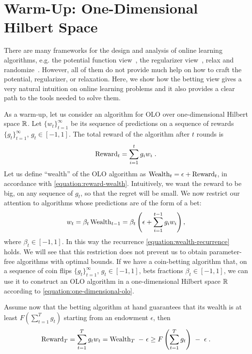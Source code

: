 \section{Warm-Up: One-Dimensional Hilbert Space}
\label{section:one-dimensional-hilbert-space-olo}

There are many frameworks for the design and analysis of online learning
algorithms, e.g. the potential function view~\cite{Cesa-Bianchi-Lugosi-2006},
the regularizer view~\cite{Shalev-Shwartz-2011}, relax and
randomize~\cite{Rakhlin-Shamir-Sridharan-2012}. However, all of them do not
provide much help on how to craft the potential, regularizer, or relaxation.
Here, we show how the betting view gives a very natural intuition on online
learning problems and it also provides a clear path to the tools needed to
solve them.

As a warm-up, let us consider an algorithm for OLO over one-dimensional Hilbert
space $\mathbb{R}$.  Let $\{w_t\}_{t=1}^\infty$ be its sequence of predictions on a
sequence of rewards $\{g_t\}_{t=1}^\infty$, $g_t \in [-1,1]$. The total reward
of the algorithm after $t$ rounds is
\vspace{-.1cm}
\[
\operatorname{Reward}_t = \sum_{i=1}^t g_i w_i \; .
\]
Let us define ``wealth'' of the OLO algorithm as $\operatorname{Wealth}_t = \epsilon +
\operatorname{Reward}_t$, in accordance with \eqref{equation:reward-wealth}.
Intuitively, we want the reward to be big, on any sequence of $g_t$, so that
the regret will be small. We now restrict our attention to algorithms whose
predictions are of the form of a bet:
\vspace{-.1cm}
\begin{equation}
\label{equation:one-dimensional-olo}
w_t = \beta_t \operatorname{Wealth}_{t-1}
= \beta_t \left(\epsilon+ \sum_{i=1}^{t-1} g_i w_i \right),
\end{equation}
where $\beta_t \in [-1,1]$. In this way the recurrence
\eqref{equation:wealth-recurrence} holds. We will see that this restriction
does not prevent us to obtain parameter-free algorithms with optimal bounds.
If we have a coin-betting algorithm that, on a sequence of coin flips
$\{g_t\}_{t=1}^\infty$, $g_t \in [-1,1]$, bets fractions $\beta_t \in [-1,1]$,
we can use it to construct an OLO algorithm in a one-dimensional Hilbert space
$\mathbb{R}$ according to \eqref{equation:one-dimensional-olo}.

Assume now that the betting algorithm at hand guarantees that its wealth is at
least $F(\sum_{t=1}^T g_t)$ starting from an endowment $\epsilon$, then
\vspace{-.1cm}
\begin{equation}
\label{equation:one-dimensional-olo-reward-lower-bound}
\Reward_T
= \sum_{t=1}^T g_t w_t
= \Wealth_T \ - \ \epsilon \ge F\left(\sum_{t=1}^T g_t \right) \ - \ \epsilon \; .
\end{equation}

